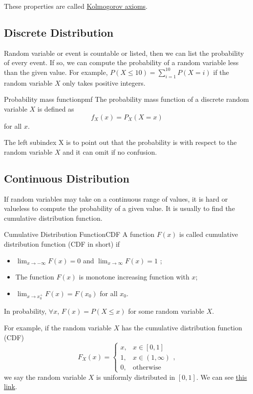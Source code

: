 \documentclass[titlestyle=hang,11pt]{elegantbook}
\begin{document}
These properties are called \href{https://en.wikipedia.org/wiki/Probability_axioms}{Kolmogorov axioms}.

\subsection{Discrete Distribution}

Random variable or event is countable or listed, then we can list the probability of every event.
If so, we can compute the probability of a random variable less than the given value. For example, $P(X\leq 10)=\sum_{i=1}^{10}P(X=i)$ if the random variable $X$ only takes positive integers.
\begin{definition}{Probability mass function}{pmf}
The probability mass function  of a discrete random variable $X$ is defined as
$$f_X(x)=P_X(X=x)$$
for all $x$.
\end{definition}
The left subindex $\mathrm{X}$ is to point out that the probability is  with respect to the random variable $X$ and it can omit if no confusion.

\subsection{Continuous Distribution}

If random variables may take on a continuous range of values, it is hard or valueless to compute the probability of a given value. It is usually to find the cumulative distribution function.

\begin{definition}{Cumulative Distribution Function}{CDF}
 A function $F(x)$ is called cumulative distribution function (CDF in short) if
\begin{itemize}
 \item $\lim_{x\to -\infty}F(x) = 0$ and $\lim_{x\to \infty}F(x) = 1$ ;
 \item The function $F(x)$ is monotone increasing function with $x$;
 \item $\lim_{x\to x_0^+ } F(x) = F(x_0)$ for all $x_0$.
\end{itemize}
\end{definition}
In probability, $\forall x$, $F(x) = P(X\leq x)$ for some random variable $X$.

For example, if the random variable $X$ has the cumulative distribution function (CDF)
\[ F_X(x)=\begin{cases} x, & \text{$x \in [0, 1]$}\\1, &\text{$x\in (1, \infty)$}\\0, & \text{otherwise}\end{cases}, \]
we say the random variable $X$ is uniformly distributed in $[0, 1]$.
We can see \href{https://www.encyclopediaofmath.org/index.php/Continuous_distribution}{this link}.
\end{document}
